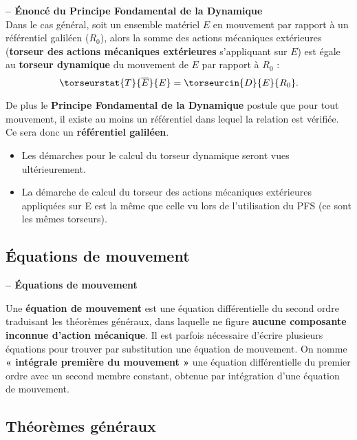 \begin{definition}\textbf{\textsf{\small -- Énoncé du Principe Fondamental de la Dynamique}} ~\\
Dans le cas général, soit un ensemble matériel $E$ en mouvement par rapport à un référentiel galiléen ($R_0$), alors la somme des actions mécaniques extérieures (\textbf{torseur des actions mécaniques extérieures} s'appliquant sur $E$) est égale au \textbf{torseur dynamique} du mouvement de $E$ par rapport à $R_0$ :
$$
\torseurstat{T}{\overline{E}}{E}=\torseurcin{D}{E}{R_0}.
$$

De plus le \textbf{Principe Fondamental de la Dynamique} postule que pour tout mouvement, il existe au moins un référentiel dans lequel la relation est vérifiée. Ce sera donc un \textbf{référentiel galiléen}.

\end{definition}

\begin{rem}
\begin{itemize}
\item Les démarches pour le calcul du torseur dynamique seront vues ultérieurement.
\item La démarche de calcul du torseur des actions mécaniques extérieures appliquées sur E est la  même que celle vu lors de l'utilisation du PFS (ce sont les mêmes torseurs). 
\end{itemize}
\end{rem}

\subsection{Équations de mouvement}

\begin{definition}\textbf{\textsf{\small -- Équations de mouvement}}

Une \textbf{équation de mouvement} est une équation différentielle du second ordre traduisant les théorèmes généraux, dans laquelle ne figure \textbf{aucune composante inconnue d'action mécanique}. Il est parfois nécessaire d'écrire plusieurs équations pour trouver par substitution une équation de mouvement. On nomme \textbf{« intégrale première du mouvement »} une équation différentielle du premier ordre avec un second membre constant, obtenue par  intégration d'une équation de mouvement. 
\end{definition}

\subsection{Théorèmes généraux}


